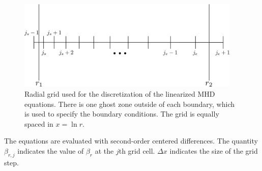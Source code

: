 \documentclass[letterpaper]{article}
\begin{document}
\begin{figure}
\centering
\includegraphics[width=0.95\textwidth]{globalcode_grid}
\caption[Radial grid used for discretizing linearized MHD
  equations]{Radial grid used for the discretization of the linearized
  MHD equations. There is one ghost zone outside of each boundary,
  which is used to specify the boundary conditions. The grid is
  equally spaced in $x=\ln{r}$.}
\label{fig:globalcode:globalcode_grid}
\end{figure}

The equations are evaluated with second-order centered differences.
The quantity $\beta_{r,j}$ indicates the value of $\beta_r$ at the
$j$th grid cell. $\Delta x$ indicates the size of the grid step.
\end{document}
